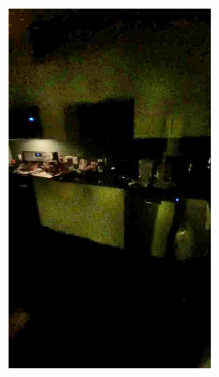 \documentclass[letterpaper,12pt]{article}
\begin{document}
\begin{figure}[htbp]
\begin{subfigure}{0.128\textwidth}
			\includegraphics[width=\linewidth]{LoLi-Phone-imgT/LightenNet}
			\captionsetup{font=scriptsize}
			\caption{}
			\label{fig: LoLi-Phone-imgT_c}  
		\end{subfigure}
		\begin{subfigure}{0.128\textwidth}

\end{subfigure}
\end{figure}
\end{document}
